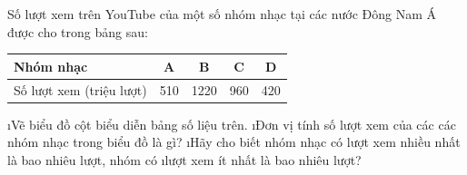 \begin{vd}
	Số lượt xem trên YouTube của một số nhóm nhạc tại các nước Đông Nam Á được cho trong bảng sau:
	\begin{center}
		\begin{tabular}{|l|c|c|c|c|}
			\hline
			Nhóm nhạc&	A&	B&	C&	D\\
			\hline
			Số lượt xem (triệu lượt)&	510&	1220&	960&	420\\
			\hline
		\end{tabular}
	\end{center}
	\begin{enumerate}[a),leftmargin=*]
		\i Vẽ biểu đồ cột biểu diễn bảng số liệu trên.
		\i Đơn vị tính số lượt xem của các các nhóm nhạc trong biểu đồ là gì?
		\i Hãy cho biết nhóm nhạc có lượt xem nhiều nhất là bao nhiêu lượt, nhóm có \i lượt xem ít nhất là bao nhiêu lượt?
	\end{enumerate}
\end{vd}
